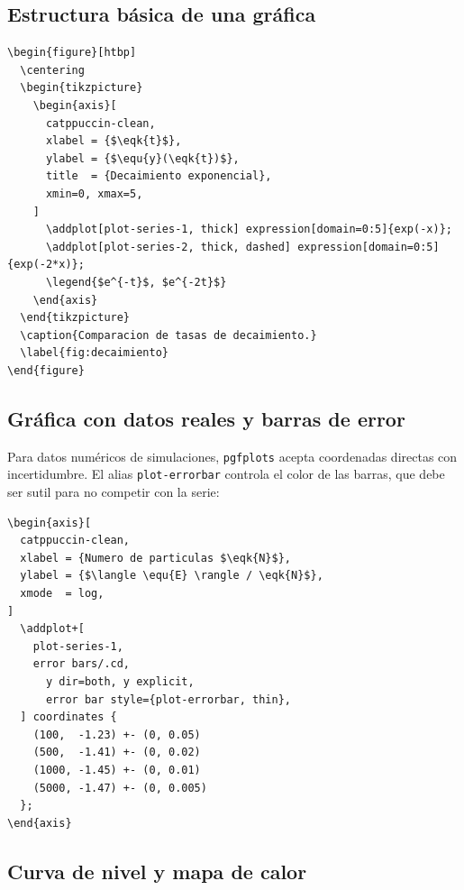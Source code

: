 \subsection{Estructura básica de una gráfica}
\label{subsec:pgfplots-basico}

\begin{lstlisting}[style=latex, frame=none, numbers=none]
\begin{figure}[htbp]
  \centering
  \begin{tikzpicture}
    \begin{axis}[
      catppuccin-clean,
      xlabel = {$\eqk{t}$},
      ylabel = {$\equ{y}(\eqk{t})$},
      title  = {Decaimiento exponencial},
      xmin=0, xmax=5,
    ]
      \addplot[plot-series-1, thick] expression[domain=0:5]{exp(-x)};
      \addplot[plot-series-2, thick, dashed] expression[domain=0:5]{exp(-2*x)};
      \legend{$e^{-t}$, $e^{-2t}$}
    \end{axis}
  \end{tikzpicture}
  \caption{Comparacion de tasas de decaimiento.}
  \label{fig:decaimiento}
\end{figure}
\end{lstlisting}

\subsection{Gráfica con datos reales y barras de error}
\label{subsec:pgfplots-errorbar}

Para datos numéricos de simulaciones, \texttt{pgfplots} acepta coordenadas
directas con incertidumbre. El alias \texttt{plot-errorbar} controla el
color de las barras, que debe ser sutil para no competir con la serie:

\begin{lstlisting}[style=latex, frame=none, numbers=none]
\begin{axis}[
  catppuccin-clean,
  xlabel = {Numero de particulas $\eqk{N}$},
  ylabel = {$\langle \equ{E} \rangle / \eqk{N}$},
  xmode  = log,
]
  \addplot+[
    plot-series-1,
    error bars/.cd,
      y dir=both, y explicit,
      error bar style={plot-errorbar, thin},
  ] coordinates {
    (100,  -1.23) +- (0, 0.05)
    (500,  -1.41) +- (0, 0.02)
    (1000, -1.45) +- (0, 0.01)
    (5000, -1.47) +- (0, 0.005)
  };
\end{axis}
\end{lstlisting}

\subsection{Curva de nivel y mapa de calor}
\label{subsec:pgfplots-contour}

